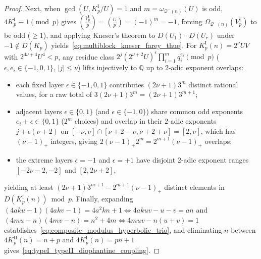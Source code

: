\documentclass[11pt, a4paper]{article}
\theoremstyle{plain}
\theoremstyle{definition}
\newcommand{\Q}{\mathbb{Q}}
\newcommand{\leg}[2]{\left(\frac{#1}{#2}\right)}
\begin{document}
\begin{proof}
Next, when $\gcd(U,K_p^{\mathrm{I}}/U)=1$ and $m=\omega_{\mathcal{Q}^{-}(n)}(U)$ is odd, $4K_p^{\mathrm{I}}\equiv1\pmod p$ gives $\leg{V_p^{\mathrm{I}}}{p}=\leg{U}{p}=(-1)^{m}=-1$, forcing $\Omega_{\mathcal{Q}^{-}(n)}(V_p^{\mathrm{I}})$ to be odd ($\ge1$), and applying Kneser's theorem to $D(U_1)\cdots D(U_r)$ under $-1\notin D(K_p)$ yields~\eqref{eq:multiblock_kneser_farey_thue}. For $K_p^{\mathrm{I}}(n)=2^{\nu}UV$ with $2^{4\nu+4}U^{4}<p$, any residue class $2^{j}(2^{\nu+2}U)^{\epsilon}\prod_{i=1}^{m}q_i^{e_i}\pmod p$ ($\epsilon,e_i\in\{-1,0,1\}$, $|j|\le\nu$) lifts injectively to $\Q$ up to $2$-adic exponent overlaps:
\begin{itemize}
    \item each fixed layer $\epsilon\in\{-1,0,1\}$ contributes $(2\nu+1)3^{m}$ distinct rational values, for a raw total of $3(2\nu+1)3^{m}=(2\nu+1)3^{m+1}$;
    \item adjacent layers $\epsilon\in\{0,1\}$ (and $\epsilon\in\{-1,0\}$) share common odd exponents $e_i+\epsilon\in\{0,1\}$ ($2^{m}$ choices) and overlap in their $2$-adic exponents $j+\epsilon(\nu+2)$ on $[-\nu,\nu]\cap[\nu+2-\nu,\nu+2+\nu]=[2,\nu]$, which has $(\nu-1)_+$ integers, giving $2(\nu-1)_+ 2^{m}=2^{m+1}(\nu-1)_+$ overlaps;
    \item the extreme layers $\epsilon=-1$ and $\epsilon=+1$ have disjoint $2$-adic exponent ranges $[-2\nu-2,-2]$ and $[2,2\nu+2]$,
\end{itemize}
yielding at least $(2\nu+1)3^{m+1}-2^{m+1}(\nu-1)_+$ distinct elements in $D(K_p^{\mathrm{I}}(n))\bmod p$. Finally, expanding $(4aku-1)(4akv-1)=4a^{2}kn+1\iff 4akuv-u-v=an$ and $(4mu-n)(4mv-n)=n^{2}+4m\iff 4muv-n(u+v)=1$ establishes~\eqref{eq:composite_modulus_hyperbolic_trio}, and eliminating $n$ between $4K_p^{\mathrm{II}}(n)=n+p$ and $4K_p^{\mathrm{I}}(n)=pn+1$ gives~\eqref{eq:typeI_typeII_diophantine_coupling}.
\end{proof}
\end{document}
